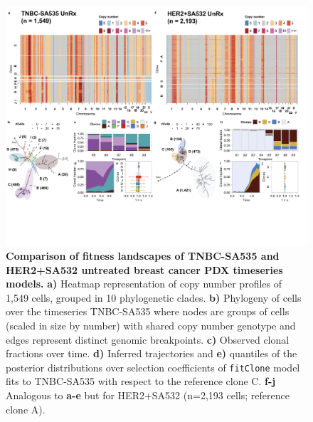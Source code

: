 \begin{figure}
\centering
\includegraphics[width=\textwidth]{Figures/chap4/SA535_SA532.png}
	
\caption[Untreated PDX timeseries clonal dynamics at single cell level]
	{\small
	\textbf{Comparison of fitness landscapes of TNBC-SA535 and HER2+SA532 untreated breast cancer PDX timeseries models.}
	    \textbf{a)} Heatmap representation of copy number profiles of 1,549 cells, grouped in 10 phylogenetic clades. \textbf{b)} Phylogeny of cells over the timeseries TNBC-SA535 where nodes are groups of cells (scaled in size by number) with shared copy number genotype and edges represent distinct genomic breakpoints. \textbf{c)} Observed clonal fractions over time. \textbf{d)} Inferred trajectories and \textbf{e)} quantiles of the posterior distributions over selection coefficients of \texttt{fitClone} model fits to TNBC-SA535 with respect to the reference clone C. \textbf{f-j} Analogous to \textbf{a-e} but for HER2+SA532 (n=2,193 cells; reference clone A).}
\label{sfig:SA535heatmapdynamicsHER2}
\end{figure}
